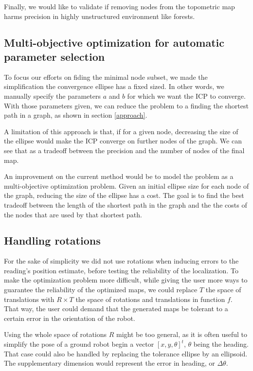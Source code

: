 \documentclass[letterpaper,10 pt,conference]{ieeeconf}
\begin{document}
Finally, we would like to validate if removing nodes from the topometric map harms precision in highly unstructured environment like forests.

\subsection{Multi-objective optimization for automatic parameter selection}

To focus our efforts on fiding the minimal node subset, we made the simplification
the convergence ellipse has a fixed sized. In other words, we manually specify
the parameters $a$ and $b$ for which we want the ICP to converge. With those
parameters given, we can reduce the problem to a finding the shortest path in a
graph, as shown in section \ref{approach}.

A limitation of this approach is that, if for a given node, decreasing the size of the ellipse would
make the ICP converge on further nodes of the graph. We can see that as a tradeoff between the
precision and the number of nodes of the final map.

An improvement on the current method would be to model the problem as a multi-objective optimization
problem. Given an initial ellipse size for each node of the graph, reducing the size of the
ellipse has a cost. The goal is to find the best tradeoff between the length of the shortest path in
the graph and the the costs of the nodes that are used by that shortest path.

\subsection{Handling rotations}

For the sake of simplicity we did not use rotations when inducing errors to the reading's
position estimate, before testing the reliability of the localization. To make the optimization
problem more difficult, while giving the user more ways to guarantee the reliability of the optimized
maps, we could replace $T$ the space of translations with $R \times T$ the space of rotations and
translations in function $f$. That way, the user could demand that the generated maps be tolerant to
a certain error in the orientation of the robot.

Using the whole space of rotations $R$ might be too general, as it is often useful to simplify the pose of a
ground robot begin a vector $[x, y, \theta]^t$, $\theta$ being the heading. That case could also be
handled by replacing the tolerance ellipse by an ellipsoid. The supplementary dimension would
represent the error in heading, or $\Delta \theta$.
\end{document}
